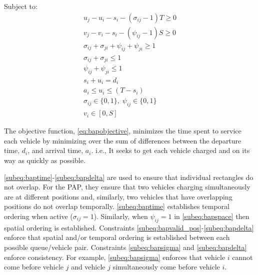 \documentclass[ee,msthesis]{usuthesis}
\begin{document}
Subject to:
\begin{subequations}
\label{eq:bapconstrs}
\begin{align}
    u_j - u_i - s_i - (\sigma_{ij} - 1)T \geq 0                  \label{subeq:baptime}          \\
    v_j - v_i - s_i - (\psi_{ij} - 1)S \geq 0                \label{subeq:bapspace}           \\
    \sigma_{ij} + \sigma_{ji} + \psi_{ij} + \psi_{ji} \geq 1 \label{subeq:bapvalid_pos}     \\
    \sigma_{ij} + \sigma_{ji} \leq 1                              \label{subeq:bapsigma}        \\
    \psi_{ij} + \psi_{ji} \leq 1                              \label{subeq:bapdelta}        \\
    s_i + u_i = d_i                                               \label{subeq:bapdetach}       \\
    a_i \leq u_i \leq (T - s_i)                                   \label{subeq:bapvalid_starts} \\
    \sigma_{ij} \in \{0,1\},\;\psi_{ij} \in \{0,1\}\;           \label{subeq:bapsdspace}      \\
    v_i \in [0, S ]                                               \label{subeq:bapvspace}
\end{align}
\end{subequations}

\noindent

The objective function, \autoref{eq:bapobjective}, minimizes the time spent to service each vehicle by minimizing over
the sum of differences between the departure time, \(d_i\), and arrival time, \(a_i\). i.e., It seeks to get each vehicle
charged and on its way as quickly as possible.

\autoref{subeq:baptime}-\autoref{subeq:bapdelta} are used to ensure that individual rectangles do not overlap. For the
PAP, they ensure that two vehicles charging simultaneously are at different positions and, similarly, two vehicles that
have overlapping positions do not overlap temporally. \autoref{subeq:baptime} establishes temporal ordering when active
(\(\sigma_{ij}=1\)). Similarly, when \(\psi_{ij} =1\) in \autoref{subeq:bapspace} then spatial ordering is established. Constraints
\autoref{subeq:bapvalid_pos}-\autoref{subeq:bapdelta} enforce that spatial and/or temporal ordering is established
between each possible queue/vehicle pair. Constraints \autoref{subeq:bapsigma} and \autoref{subeq:bapdelta} enforce
consistency. For example, \autoref{subeq:bapsigma} enforces that vehicle \(i\) cannot come before vehicle \(j\) and vehicle
\(j\) simultaneously come before vehicle \(i\).
\end{document}
